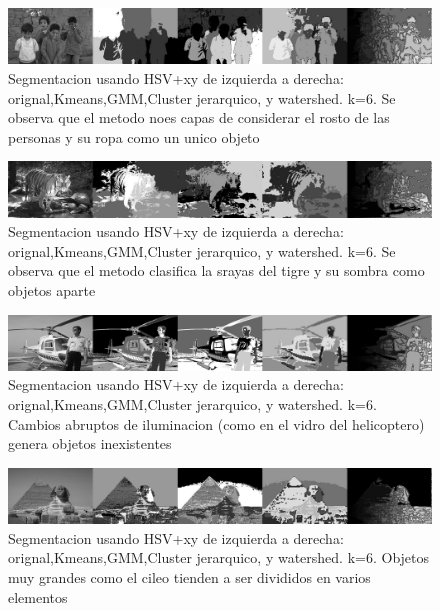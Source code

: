 \documentclass[10pt,twocolumn,letterpaper]{article}
\begin{document}
\begin{figure}
\begin{center}
\includegraphics[width=0.95\linewidth]
                   {img/Kidshsvxy.jpg}
\end{center}
   \caption{Segmentacion usando HSV+xy de izquierda a derecha: orignal,Kmeans,GMM,Cluster jerarquico, y watershed. k=6. Se observa que el metodo noes capas de considerar el rosto de las personas y su ropa como un unico objeto}
\label{fig:kids}
\end{figure}

\begin{figure}
\begin{center}
\includegraphics[width=0.95\linewidth]
                   {img/Tigerhsvxy.jpg}
\end{center}
   \caption{Segmentacion usando HSV+xy de izquierda a derecha: orignal,Kmeans,GMM,Cluster jerarquico, y watershed. k=6. Se observa que el metodo clasifica la srayas del tigre y su sombra como objetos aparte}
\label{fig:tiger}
\end{figure}

\begin{figure}
\begin{center}
\includegraphics[width=0.95\linewidth]
                   {img/Heli.jpg}
\end{center}
   \caption{Segmentacion usando HSV+xy de izquierda a derecha: orignal,Kmeans,GMM,Cluster jerarquico, y watershed. k=6. Cambios abruptos de iluminacion (como en el vidro del helicoptero) genera objetos inexistentes}
\label{fig:heli}
\end{figure}

\begin{figure}
\begin{center}
\includegraphics[width=0.95\linewidth]
                   {img/Pyramid.jpg}
\end{center}
   \caption{Segmentacion usando HSV+xy de izquierda a derecha: orignal,Kmeans,GMM,Cluster jerarquico, y watershed. k=6. Objetos muy grandes como el cileo tienden a ser divididos en varios elementos}
\label{fig:pyra}
\end{figure}
\end{document}
